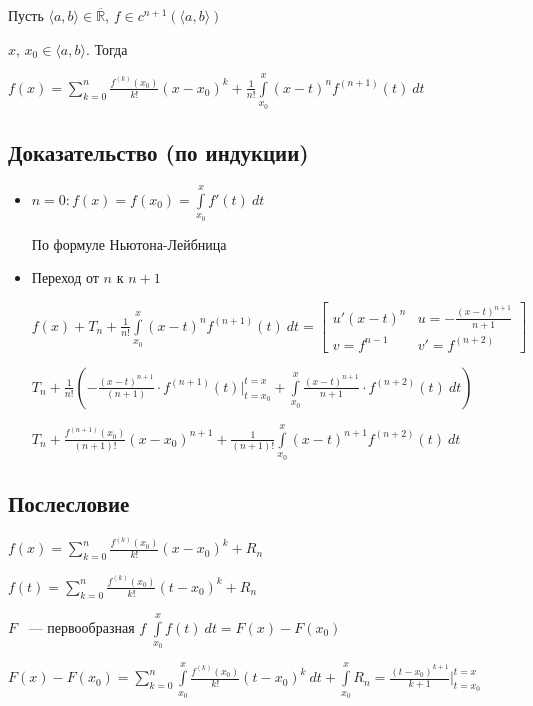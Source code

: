 \documentclass{article}
\begin{document}
			Пусть $\langle a, b \rangle \in \overline{\mathbb{R}}$, $f \in c^{n + 1} (\langle a, b \rangle)$

			$x$, $x_0 \in \langle a, b \rangle$. Тогда

			$f(x) = \sum\limits^n_{k = 0} \frac{f^{(k)} (x_0)}{k!} (x - x_0)^k + \frac{1}{n!} \int\limits^x_{x_0} (x - t)^n f^{(n + 1)}(t) \ dt$

		\subsection{Доказательство (по индукции)}

			\begin{itemize}

				\item $n = 0 : f(x) = f(x_0) = \int\limits^x_{x_0} f'(t) \ dt$

					По формуле Ньютона-Лейбница

				\item Переход от $n$ к $n + 1$

					$f(x) + T_n + \frac{1}{n!} \int\limits^x_{x_0} (x - t)^n f^{(n + 1)} (t) \ dt = \begin{bmatrix} u' (x - t)^n & u = -\frac{(x - t)^{n + 1}}{n + 1} \\ v = f^{n - 1} & v' = f^{(n + 2)} \end{bmatrix}$
						
					$T_n + \frac{1}{n!} \left( -\frac{(x - t)^{n + 1}}{(n + 1)} \cdot f^{(n + 1)} (t) \bigg|^{t = x}_{t = x_0} + \int\limits^x_{x_0} \frac{(x - t)^{n + 1}}{n + 1} \cdot f^{(n + 2)} (t) \ dt \right)$ 
					
					$T_n + \frac{f^{(n + 1)} (x_0)}{(n + 1)!} (x - x_0)^{n + 1} + \frac{1}{(n + 1)!} \int\limits^x_{x_0} (x - t)^{n + 1} f^{(n + 2)} (t) \ dt$

			\end{itemize}

		\subsection{Послесловие}

			$f(x) = \sum\limits^n_{k = 0} \frac{f^{(k)}(x_0)}{k!} (x - x_0)^k + R_n$

			$f(t) = \sum\limits^n_{k = 0} \frac{f^{(k)}(x_0)}{k!} (t - x_0)^k + R_n$

			$F$ ~--- первообразная $f$  $\int\limits^x_{x_0} f(t) \ dt = F(x) - F(x_0)$

			$F(x) - F(x_0) = \sum\limits^n_{k = 0} \int\limits^x_{x_0} \frac{f^{(k)} (x_0)}{k!} (t - x_0)^k \ dt + \int\limits^x_{x_0} R_n = \frac{(t - x_0)^{k + 1}}{k + 1} \bigg|^{t = x}_{t = x_0}$
\end{document}

